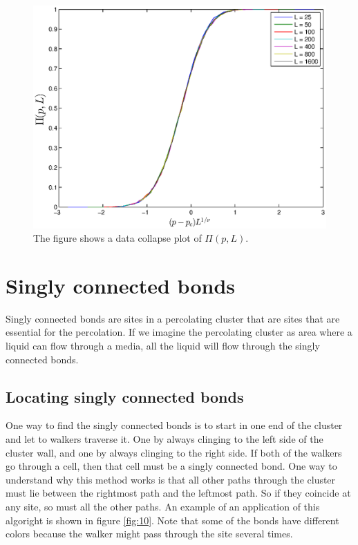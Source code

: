 \documentclass[12pt]{article}
\begin{document}
\begin{figure}[ht]
\centering

	\includegraphics[width=13cm]{datacollpi.eps}


\caption[Optional caption for list of figures]{The figure shows a data collapse plot of $\Pi(p,L)$.}
\label{fig:dcp}
\end{figure}

\section{Singly connected bonds}
Singly connected bonds are sites in a percolating cluster that are sites that are essential for the percolation. If we imagine the percolating cluster as area where a liquid can flow through a media, all the liquid will flow through the singly connected bonds. 

\subsection{Locating singly connected bonds} \label{sec:lscb}
One way to find the singly connected bonds is to start in one end of the cluster and let to walkers traverse it. One by always clinging to the left side of the cluster wall, and one by always clinging to the right side. If both of the walkers go through a cell, then that cell must be a singly connected bond. One way to understand why this method works is that all other paths through the cluster must lie between the rightmost path and the leftmost path. So if they coincide at any site, so must all the other paths. An example of an application of this algoright is shown in figure \ref{fig:10}. Note that some of the bonds have different colors because the walker might pass through the site several times.
\end{document}
